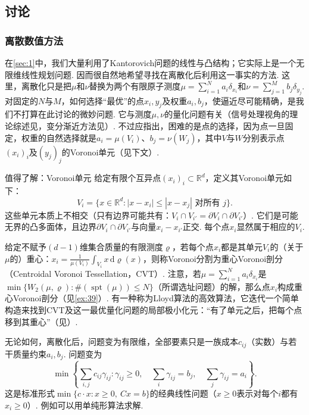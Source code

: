 \subsection{讨论}\label{sec:6.4}
\subsubsection{离散数值方法}\label{sec:6.4.1}
在\autoref{sec:1}中，我们大量利用了Kantorovich问题的线性与凸结构；它实际上是一个无限维线性规划问题. 因而很自然地希望寻找在离散化后利用这一事实的方法. 这里，离散化只是把$\mu$和$\nu$替换为两个有限原子测度$\mu=\sum_{i=1}^N a_i\delta_{x_i}$和$\nu=\sum_{j=1}^M b_j\delta_{y_j}$. 对固定的$N$与$M$，如何选择“最优”的点$x_i,y_j$及权重$a_i,b_j$，使逼近尽可能精确，是我们不打算在此讨论的微妙问题. \label{idx:i124-p236}
它与测度$\mu,\nu$的量化问题有关（信号处理视角的理论综述见\cite{b187}，变分渐近方法见\cite{b72}）. 不过应指出，困难的是点的选择，因为点一旦固定，权重的自然选择就是$a_i=\mu(V_i)$、$b_j=\nu(W_j)$，其中$V$与$W$分别表示点$(x_i)_i$及$(y_j)_j$的Voronoi单元（见下文）.

\begin{sourcebox}{值得了解：Voronoi单元}\label{box:6.6}
给定有限个互异点$(x_i)_i\subset\mathbb R^d$，定义其Voronoi单元如下：
\[
V_i=\{x\in\mathbb R^d:|x-x_i|\le|x-x_j|\text{ 对所有 }j\}.
\]
这些单元本质上不相交（只有边界可能共有：$V_i\cap V_{i'}=\partial V_i\cap\partial V_{i'}$）. 它们是可能无界的凸多面体，且边界$\partial V_i\cap\partial V_{i'}$与向量$x_i-x_{i'}$正交. 每个点$x_i$显然属于相应的$V_i$.

给定不赋予$(d-1)$维集合质量的有限测度$\varrho$，若每个点$x_i$都是其单元$V_i$的（关于$\mu$的）重心：$x_i=\frac1{\mu(V_i)}\int_{V_i}x\,\mathrm d\varrho(x)$，则称Voronoi分割为重心Voronoi剖分（Centroidal Voronoi Tessellation，CVT）. 注意，若$\mu=\sum_{i=1}^N a_i\delta_{x_i}$是$\min\{W_2(\mu,\varrho):\#(\operatorname{spt}(\mu))\le N\}$（所谓选址问题）的解，那么点$x_i$构成重心Voronoi剖分（见\autoref{ex:39}）. 有一种称为Lloyd算法的高效算法，它迭代一个简单构造来找到CVT及这一最优量化问题的局部极小化元：“有了单元之后，把每个点移到其重心”（见\cite{b213}）.
\end{sourcebox}

无论如何，离散化后，问题变为有限维，全部要素只是一族成本$c_{ij}$（实数）与若干质量约束$a_i,b_j$. 问题变为
\begin{equation}\label{eq:6.2}
\min\left\{\sum_{i,j}c_{ij}\gamma_{ij}:\gamma_{ij}\ge0,\quad
\sum_i\gamma_{ij}=b_j,\quad\sum_j\gamma_{ij}=a_i\right\}.
\end{equation}
这是标准形式$\min\{c\cdot x:x\ge0,\ Cx=b\}$的经典线性问题（$x\ge0$表示对每个$i$都有$x_i\ge0$）. 例如可以用单纯形算法求解.

